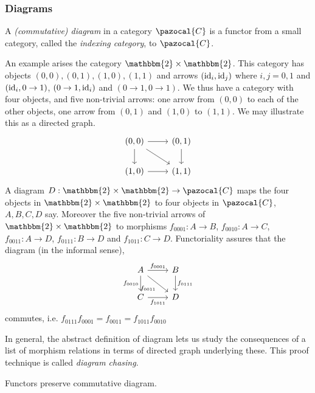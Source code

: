 \subsubsection{Diagrams}
    \begin{definition}
        A \emph{(commutative) diagram} in a category $\pazocal{C}$ is a functor from a small category, called the \emph{indexing category}, to $\pazocal{C}$. 
    \end{definition}
    \begin{example}
        An example arises the category $\mathbbm{2}\times \mathbbm{2}$. This category has objects $(0,0),(0,1),(1,0),(1,1)$ and arrows $(\mathrm{id}_i,\mathrm{id}_j)$ where $i,j=0,1$ and $(\mathrm{id}_i,0\rightarrow 1)$, $(0\rightarrow 1,\mathrm{id}_i)$ and $(0\rightarrow 1,0\rightarrow 1)$. We thus have a category with four objects, and five non-trivial arrows: one arrow from $(0,0)$ to each of the other objects, one arrow from $(0,1)$ and $(1,0)$ to $(1,1)$. We may illustrate this as a directed graph.
        $$
            \begin{tikzcd}
                (0,0) \arrow[r]\arrow[d]\arrow[rd] & (0,1)\arrow[d]\\
                (1,0) \arrow[r] & (1,1)
            \end{tikzcd}
        $$
        A diagram $D : \mathbbm{2}\times \mathbbm{2} \rightarrow \pazocal{C}$ maps the four objects in $\mathbbm{2} \times \mathbbm{2}$ to four objects in $\pazocal{C}$, $A,B,C,D$ say. Moreover the five non-trivial arrows of $\mathbbm{2}\times \mathbbm{2}$ to morphisms $f_{0001} : A\rightarrow B$, $f_{0010}: A\rightarrow C$, $f_{0011}: A\rightarrow D$, $f_{0111}: B \rightarrow D$ and $f_{1011} : C\rightarrow D$. Functoriality assures that the diagram (in the informal sense),
        $$
            \begin{tikzcd} 
                A \arrow[r,"f_{0001}"]\arrow[rd, "f_{0011}",swap]\arrow[d,"f_{0010}",swap] & B\arrow[d,"f_{0111}"]\\
                C \arrow[r,"f_{1011}",swap] & D
            \end{tikzcd}
        $$ 
        commutes, i.e. $f_{0111}f_{0001}=f_{0011}=f_{1011}f_{0010}$
    \end{example}
    In general, the abstract definition of diagram lets us study the consequences of a list of morphism relations in terms of directed graph underlying these. This proof technique is called \emph{diagram chasing}.
    \begin{lemma}
        Functors preserve commutative diagram.
    \end{lemma}
